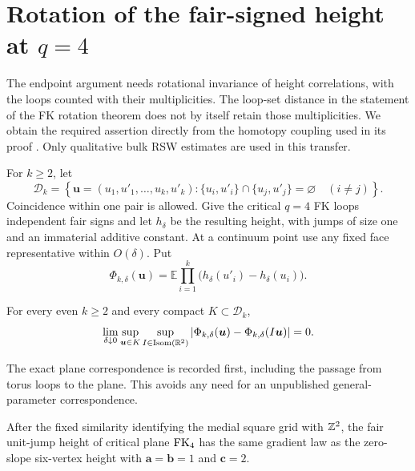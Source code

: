 \section{Rotation of the fair-signed height at \texorpdfstring{$q=4$}{q=4}}
\label{sec:q4-rotation-repair}

The endpoint argument needs rotational invariance of height correlations,
with the loops counted with their multiplicities.  The loop-set distance
in the statement of the FK rotation theorem does not by itself retain
those multiplicities.  We obtain the required assertion directly from
the homotopy coupling used in its proof
\cite[Sections~3.5--3.6 and~4.2]{DCKKMO2026Rotation}.
Only qualitative bulk RSW estimates are used in this transfer.

For $k\ge2$, let
\[
 \mathcal D_k=
 \left\{\boldsymbol u=(u_1,u'_1,\ldots,u_k,u'_k):
 \{u_i,u'_i\}\cap\{u_j,u'_j\}=\varnothing\quad(i\ne j)\right\}.
\]
Coincidence within one pair is allowed.  Give the critical $q=4$ FK
loops independent fair signs and let $h_\delta$ be the resulting height,
with jumps of size one and an immaterial additive constant.  At a
continuum point use any fixed face representative within $O(\delta)$.
Put
\begin{equation}
 \Phi_{k,\delta}(\boldsymbol u)
 =\mathbb E\prod_{i=1}^k
       \bigl(h_\delta(u'_i)-h_\delta(u_i)\bigr).
 \label{eq:rr-Phi}
\end{equation}

\begin{theorem}
\label{thm:rr-rotation}
For every even $k\ge2$ and every compact $K\subset\mathcal D_k$,
\begin{equation}
 \lim_{\delta\downarrow0}
 \sup_{\boldsymbol u\in K}\sup_{I\in\operatorname{Isom}(\mathbb R^2)}
 \left|\Phi_{k,\delta}(\boldsymbol u)
             -\Phi_{k,\delta}(I\boldsymbol u)\right|=0.
 \label{eq:rr-target}
\end{equation}
\end{theorem}

The exact plane correspondence is recorded first, including the
passage from torus loops to the plane.  This avoids any need for an
unpublished general-parameter correspondence.

\begin{lemma}
\label{lem:rr-bkw}
After the fixed similarity identifying the medial square grid with
$\mathbb Z^2$, the fair unit-jump height of critical plane $\operatorname{FK}_4$ has the
same gradient law as the zero-slope six-vertex height with
$\mathbf a=\mathbf b=1$ and $\mathbf c=2$.
\end{lemma}


